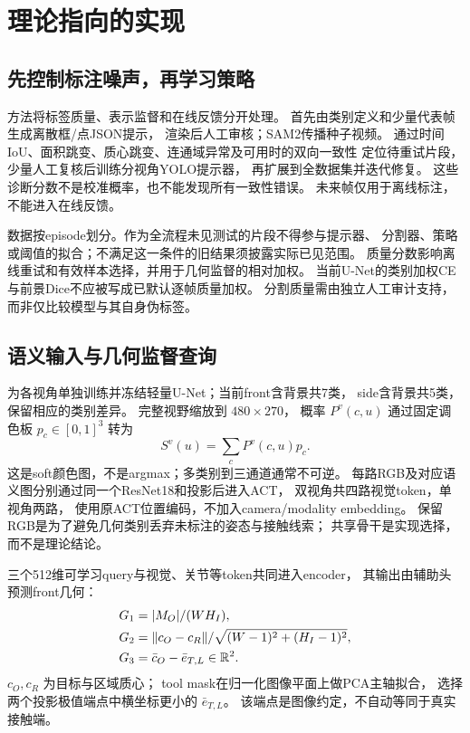 \section{理论指向的实现}
\subsection{先控制标注噪声，再学习策略}
方法将标签质量、表示监督和在线反馈分开处理。
首先由类别定义和少量代表帧生成离散框/点JSON提示，
渲染后人工审核；SAM2\cite{ravi2024sam2}传播种子视频。
通过时间IoU、面积跳变、质心跳变、连通域异常及可用时的双向一致性
定位待重试片段，少量人工复核后训练分视角YOLO提示器，
再扩展到全数据集并迭代修复。
这些诊断分数不是校准概率，也不能发现所有一致性错误。
未来帧仅用于离线标注，不能进入在线反馈。

数据按episode划分。作为全流程未见测试的片段不得参与提示器、
分割器、策略或阈值的拟合；不满足这一条件的旧结果须披露实际已见范围。
质量分数影响离线重试和有效样本选择，并用于几何监督的相对加权。
当前U-Net的类别加权CE与前景Dice不应被写成已默认逐帧质量加权。
分割质量需由独立人工审计支持，而非仅比较模型与其自身伪标签。

\subsection{语义输入与几何监督查询}
为各视角单独训练并冻结轻量U-Net；当前front含背景共7类，
side含背景共5类，保留相应的类别差异。
完整视野缩放到 $480\times270$，
概率 $P^v(c,u)$ 通过固定调色板 $p_c\in[0,1]^3$ 转为
\begin{equation}
 S^v(u)=\sum_c P^v(c,u)p_c.
\end{equation}
这是soft颜色图，不是argmax；多类别到三通道通常不可逆。
每路RGB及对应语义图分别通过同一个ResNet18和投影后进入ACT，
双视角共四路视觉token，单视角两路，
使用原ACT位置编码，不加入camera/modality embedding。
保留RGB是为了避免几何类别丢弃未标注的姿态与接触线索；
共享骨干是实现选择，而不是理论结论。

三个512维可学习query与视觉、关节等token共同进入encoder，
其输出由辅助头预测front几何：
\begin{align}
 G_1&=|M_O|/(W H_I),\nonumber\\
 G_2&=\lVert c_O-c_R\rVert/\sqrt{(W-1)^2+(H_I-1)^2},\\
 G_3&=\bar c_O-\bar e_{T,L}\in\mathbb R^2.\nonumber
\end{align}
$c_O,c_R$ 为目标与区域质心；
tool mask在归一化图像平面上做PCA主轴拟合，
选择两个投影极值端点中横坐标更小的 $\bar e_{T,L}$。
该端点是图像约定，不自动等同于真实接触端。

